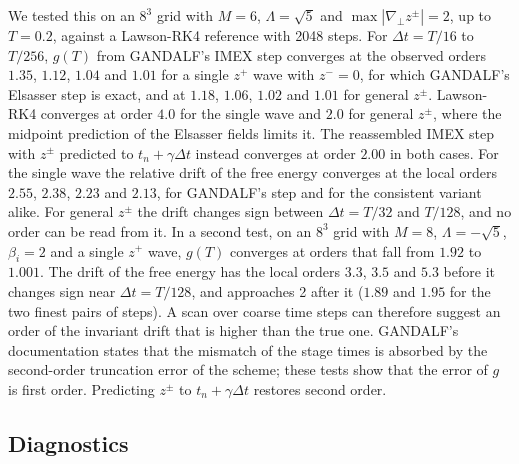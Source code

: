 We tested this on an $8^3$ grid with $M=6$, $\Lambda=\sqrt5$ and $\max|\nabla_\perp z^\pm|=2$, up to $T=0.2$, against a Lawson-RK4 reference with 2048 steps. For $\Delta t=T/16$ to $T/256$, $g(T)$ from GANDALF's IMEX step converges at the observed orders $1.35$, $1.12$, $1.04$ and $1.01$ for a single $z^+$ wave with $z^-=0$, for which GANDALF's Elsasser step is exact, and at $1.18$, $1.06$, $1.02$ and $1.01$ for general $z^\pm$. Lawson-RK4 converges at order $4.0$ for the single wave and $2.0$ for general $z^\pm$, where the midpoint prediction of the Elsasser fields limits it. The reassembled IMEX step with $z^\pm$ predicted to $t_n+\gamma\Delta t$ instead converges at order $2.00$ in both cases. For the single wave the relative drift of the free energy converges at the local orders $2.55$, $2.38$, $2.23$ and $2.13$, for GANDALF's step and for the consistent variant alike. For general $z^\pm$ the drift changes sign between $\Delta t=T/32$ and $T/128$, and no order can be read from it. In a second test, on an $8^3$ grid with $M=8$, $\Lambda=-\sqrt5$, $\beta_i=2$ and a single $z^+$ wave, $g(T)$ converges at orders that fall from $1.92$ to $1.001$. The drift of the free energy has the local orders $3.3$, $3.5$ and $5.3$ before it changes sign near $\Delta t=T/128$, and approaches 2 after it ($1.89$ and $1.95$ for the two finest pairs of steps). A scan over coarse time steps can therefore suggest an order of the invariant drift that is higher than the true one. GANDALF's documentation states that the mismatch of the stage times is absorbed by the second-order truncation error of the scheme; these tests show that the error of $g$ is first order. Predicting $z^\pm$ to $t_n+\gamma\Delta t$ restores second order.

\subsection{Diagnostics}\label{appD:diag}

